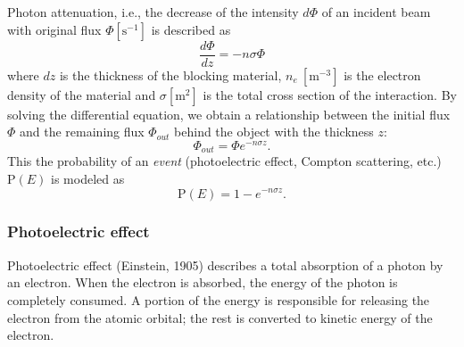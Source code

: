 \documentclass[a4paper,12pt,titlepage, twoside]{article}
\newcommand{\unit}[2]{$#1~\ensuremath{\mathrm{#2}}$}
\begin{document}
Photon attenuation, i.e., the decrease of the intensity $d\Phi$ of an incident beam with original flux $\Phi \left[\mathrm{s}^{-1}\right]$ is described as
\begin{equation}
  \frac{d\Phi}{dz} = -n\sigma\Phi
\end{equation}
where $dz$ is the thickness of the blocking material, \unit{n_e}{\left[m^{-3}\right]} is the electron density of the material and $\sigma \left[\mathrm{m}^{2}\right]$ is the total cross section of the interaction.
By solving the differential equation, we obtain a relationship between the initial flux $\Phi$ and the remaining flux $\Phi_{out}$ behind the object with the thickness $z$:
\begin{equation}
  \Phi_{out} = \Phi e^{-n\sigma z}.
\end{equation}
This the probability of an \emph{event} (photoelectric effect, Compton scattering, etc.) $\mathrm{P}\left(E\right)$ is modeled as
\begin{equation}
  \mathrm{P}\left(E\right) = 1 - e^{-n\sigma z}.
\end{equation}



\subsubsection{Photoelectric effect}

Photoelectric effect (Einstein, 1905) describes a total absorption of a photon by an electron.
When the electron is absorbed, the energy of the photon is completely consumed.
A portion of the energy is responsible for releasing the electron from the atomic orbital; the rest is converted to kinetic energy of the electron.
\end{document}
